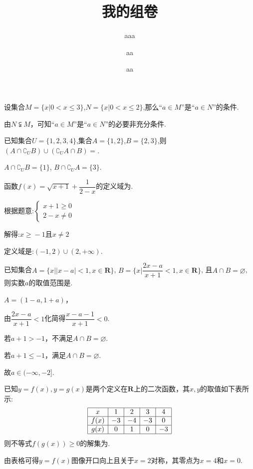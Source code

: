 \documentclass[cs4size,windows,a4paper,answers]{BHCexam}
\begin{document}
\title{我的组卷}
\subtitle{aaa}
\author{aa}
\date{aa}
\maketitle
\begin{groups}
\begin{questions}[]
\question[4] 设集合$M=\{x|0\lt x\leqslant{}3\}$,$N=\{x|0\lt x\leqslant{}2\}$,那么“$a\in{M}$”是“$a\in{N}$”的条件.
\begin{solution}
\methodonly
由$N \subsetneqq M$，可知“$a\in{M}$”是“$a\in{N}$”的必要非充分条件.



\end{solution}
\question[4] 已知集合$U=\{1,2,3,4\}$,集合$A=\{1,2\}$,$B=\{2,3\}$,则$(A\cap\complement_UB) \cup (\complement_UA\cap B)=$.
\begin{solution}
\methodonly
$A\cap\complement_UB=\{1\}$, $B\cap\complement_UA=\{3\}$.




\end{solution}
\question[4] 函数$f(x)=\sqrt{x+1}+\dfrac{1}{2-x}$的定义域为.
\begin{solution}
\methodonly
根据题意:$\left\{\begin{array}{l}{x+1\geqslant{}0}\\{2-x\neq{}0}\end{array}\right.$

解得:$x\geqslant{}-1$且$x\neq{}2$

定义域是:$(-1,2)\cup{}(2,+\infty)$.

\end{solution}
\question[4] 已知集合$A=\{x \big| |x-a| \lt 1,x\in\mathbf{R}\}$,
$B=\{x\Big|\dfrac{2x-a}{x+1}<1,x\in\mathbf{R}\}$,
且$A\cap B=\varnothing$,
 则实数$a$的取值范围是\mtk{$a \in (-\infty,-2]$}.
\begin{solution}
\methodonly
$A=(1-a,1+a)$，

由$\dfrac{2x-a}{x+1}<1$化简得$\dfrac{x-a-1}{x+1}<0$.

若$a+1 \gt -1$，不满足$A \cap B=\varnothing$.

若$a+1 \le -1$，满足$A \cap B=\varnothing$.

故$a\in(-\infty,-2]$.

\end{solution}
\question[4] 已知$y=f(x), y=g(x)$是两个定义在$\mathbf{R}$上的二次函数，其$x, y$的取值如下表所示: 
\[\begin{array}{|c|c|c|c|c|}
\hline
x & 1 & 2 & 3 & 4 \\
\hline
f(x) & -3 & -4 & -3 & 0\\
\hline
g(x) & 0 & 1 & 0 & -3\\
\hline
\end{array}\]
则不等式$f(g(x))\ge0$的解集为\mtk{$(-\infty,1]\cup[3,+\infty)$.}.
\begin{solution}
\methodonly
由表格可得$y=f(x)$图像开口向上且关于$x=2$对称，其零点为$x=4$和$x=0$.


\end{solution}
\end{questions}
\end{groups}
\end{document}
